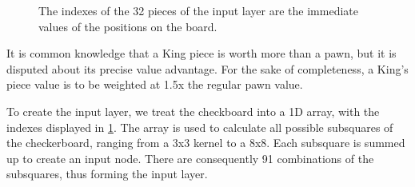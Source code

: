 \documentclass[12pt,a4paper]{article}
\newcommand{\bl}{\node [ball, ball color=black!80!white, draw=black!65!white, thin]{};}
\newcommand{\wh}{\node [ball, ball color=white] {};}
\begin{document}
    \begin{figure}[ht!]
        \centering

        \caption{The indexes of the 32 pieces of the input layer are the immediate values of the positions on the board. \label{boardarray}}
    \end{figure}

    It is common knowledge that a King piece is worth more than a pawn, but it is disputed about its precise value advantage. For the sake of completeness, a King's piece value is to be weighted at 1.5x the regular pawn value. 

    To create the input layer, we treat the checkboard into a 1D array, with the indexes displayed in \ref{boardarray}. The array is used to calculate all possible subsquares of the checkerboard, ranging from a 3x3 kernel to a 8x8. Each subsquare is summed up to create an input node. There are consequently 91 combinations of the subsquares, thus forming the input layer. 
\end{document}
